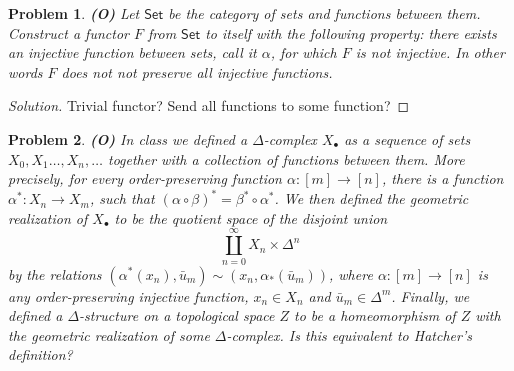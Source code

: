 
\usepackage[T1]{fontenc}


\usepackage{thmtools}
\usepackage{fancyhdr}
\pagestyle{fancy}
\usepackage{csquotes}
\newsavebox{\myheadbox}
\fancyhf{}
\cfoot{\thepage}
\date{}

\newcommand{\Set}{\mathsf{Set}}
\renewcommand{\C}{\mathsf{C}}

\thispagestyle{fancy}
\theoremstyle{normalhead}
\newtheorem{problem}{Problem}
\newtheorem{lemma}{Lemma}

\begin{problem} 
\textbf{(O)} Let $\Set$ be the category of sets and functions between them. Construct a functor $F$ from $\Set$ to itself with the following property: there exists an injective function between sets, call it $\alpha$, for which $F$ is not injective. In other words $F$ does not not preserve all injective functions. 
\end{problem}

\begin{proof}[Solution]
Trivial functor? Send all functions to some function?
\end{proof}

\newpage



\begin{problem}
\textbf{(O)} In class we defined a $\Delta$-complex $X_\bullet$ as a sequence of sets $X_0, X_1 \ldots, X_n, \ldots$ together with a collection of functions between them. More precisely, for every order-preserving function $\alpha: [m] \to [n]$, there is a function $\alpha^*: X_n \to X_m$, such that $(\alpha \circ \beta)^* = \beta^* \circ \alpha^*$. We then defined the geometric realization of $X_\bullet$ to be the quotient space of the disjoint union 
\[
\coprod_{n=0}^\infty X_n \times \Delta^n
\]
by the relations $(\alpha^*(x_n), \bar{u}_m) \sim (x_n, \alpha_*(\bar{u}_m))$, where $\alpha: [m] \to [n]$ is any order-preserving injective function, $x_n \in X_n$ and $\bar{u}_m \in \Delta^m$. Finally, we defined a $\Delta$-structure on a topological space $Z$ to be a homeomorphism of $Z$ with the geometric realization of some $\Delta$-complex. Is this equivalent to Hatcher's definition?
\end{problem}

